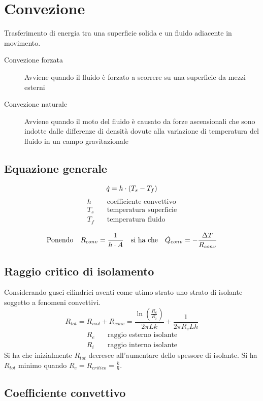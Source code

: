 \section{Convezione}
Trasferimento di energia tra una superficie solida e un fluido adiacente in movimento.
\begin{description}
 \item[Convezione forzata] Avviene quando il fluido è forzato a scorrere su una superficie da mezzi esterni
 \item[Convezione naturale] Avviene quando il moto del fluido è causato da forze ascensionali che sono indotte dalle differenze di densità dovute alla variazione di temperatura del fluido in un campo gravitazionale
\end{description}

\subsection{Equazione generale}
\[ \dot{q} = h \cdot \qty(T_s - T_f) \]
\begin{align*}
h & \quad \text{coefficiente convettivo} \\
T_s & \quad \text{temperatura superficie} \\
T_f & \quad \text{temperatura fluido} \\
\end{align*}
\[ \qq*{Ponendo} R_{conv} = \frac{1}{h \cdot A} \qq{si ha che} \dot{Q}_{conv} = -\frac{\Delta T}{R_{conv}} \]

\subsection{Raggio critico di isolamento}
Considerando gusci cilindrici aventi come utimo strato uno strato di isolante soggetto a fenomeni convettivi.
\[ R_{tot} = R_{isol} + R_{conv} = \frac{\ln(\frac{R_e}{R_i})}{2\pi L k} + \frac{1}{2\pi R_e L h} \]
\begin{align*}
R_e & \quad \text{raggio esterno isolante} \\
R_i & \quad \text{raggio interno isolante}
\end{align*}
Si ha che inizialmente $R_{tot}$ decresce all'aumentare dello spessore di isolante.
Si ha $R_{tot}$ minimo quando $R_e = R_{critico} = \frac{k}{h}$.

\subsection{Coefficiente convettivo}


